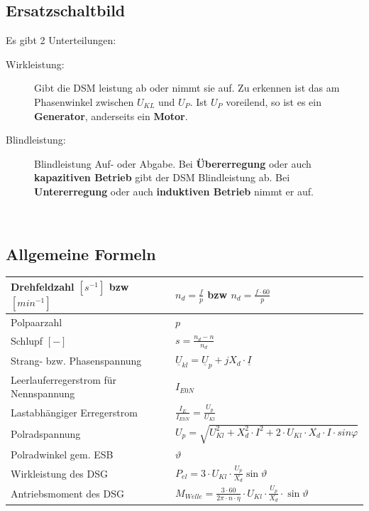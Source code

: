     \subsection{Ersatzschaltbild}
        \begin{minipage}{11cm}
            Es gibt 2 Unterteilungen: \\
            \begin{description}
                \item[Wirkleistung:] Gibt die DSM leistung ab oder nimmt sie auf. Zu erkennen ist das am Phasenwinkel
                zwischen $U_{KL}$ und $U_P$. Ist $U_P$ voreilend, so ist es ein \textbf{Generator}, anderseits ein
                \textbf{Motor}.
                \item[Blindleistung:] Blindleistung Auf- oder Abgabe. Bei \textbf{Übererregung} oder auch \textbf{kapazitiven
                Betrieb} gibt der DSM Blindleistung ab. Bei \textbf{Untererregung} oder auch \textbf{induktiven Betrieb}
                nimmt er auf.
            \end{description}
        \end{minipage}
        \begin{minipage}{8cm}
        \end{minipage}\\
        
    \subsection{Allgemeine Formeln}
    \begin{tabular}[c]{ | p{7cm} | p{8cm} |}
    	\hline
    	Drehfeldzahl $[s^{-1}]$ bzw $[min^{-1}]$ & $n_d=\frac{f}{p}$ bzw
    	$n_d=\frac{f\cdot 60}{p}$\\
    	\hline
    	Polpaarzahl & $p$ \\
    	\hline
    	Schlupf $[-]$ & $s=\frac{n_d-n}{n_d}$\\
    	\hline
    	Strang- bzw. Phasenspannung &
    	$\underline{U}_{kl}=\underline{U}_p+jX_d\cdot\underline{I}$\\
    	\hline
    	Leerlauferregerstrom für Nennspannung & $I_{E0N}$\\
    	\hline
    	Lastabhängiger Erregerstrom & $\frac{I_E}{I_{E0N}}=\frac{U_p}{U_{Kl}}$\\
    	\hline
    	Polradspannung & $U_p=\sqrt{U_{Kl}^2+X_d^2\cdot I^2+2\cdot U_{Kl}\cdot
    	X_d \cdot I\cdot sin \varphi}$\\
    	\hline
    	Polradwinkel gem. ESB & $\vartheta$\\
    	\hline
    	Wirkleistung des DSG & $P_{el}=3\cdot
    	U_{Kl}\cdot\frac{U_p}{X_d}\sin\vartheta$\\
    	\hline
    	Antriebsmoment des DSG & $M_{Welle}=\frac{3\cdot60}{2\pi\cdot n \cdot
    	\eta}\cdot U_{Kl}\cdot\frac{U_p}{X_d}\cdot\sin\vartheta$\\
    	\hline
    \end{tabular}

